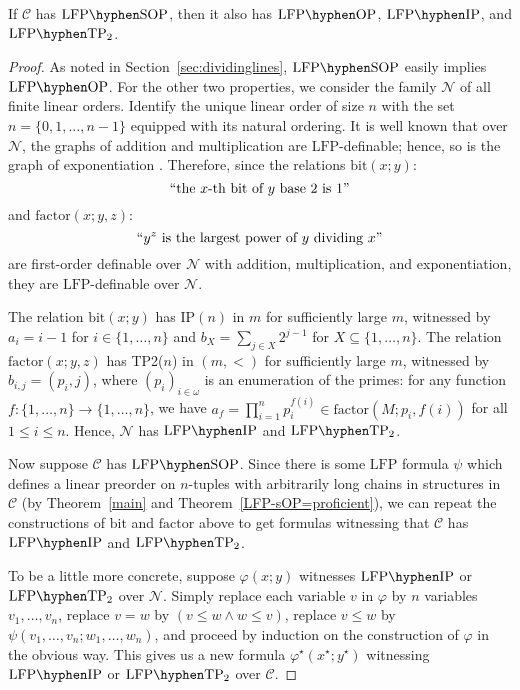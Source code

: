 \documentclass{lmcs}
\newcommand{\LFP}{\mathrm{LFP}}
\newcommand{\LFPP}[1]{\LFP\hyphen#1}
\newcommand{\OP}{\mathrm{OP}}
\newcommand{\IP}{\mathrm{IP}}
\newcommand{\SOP}{\mathrm{SOP}}
\newcommand{\TPT}{\mathrm{TP}_2}
\newcommand{\bit}{\mathrm{bit}}
\newcommand{\factor}{\mathrm{factor}}
\theoremstyle{thmC}
\begin{document}
\begin{lem}\label{fundamental-implications}
\label{N_functions}If $\mathcal{C}$ has $\LFPP{\SOP}$, then it also
has $\LFPP{\OP}$, $\LFPP{\IP}$, and $\LFPP{\TPT}$.
\end{lem}
\begin{proof}
As noted in Section~\ref{sec:dividinglines}, $\LFPP{\SOP}$ easily implies $\LFPP{\OP}$.
For the other two properties, we consider the family $\mathcal{N}$ of all finite linear orders. Identify the unique linear order of size $n$ with
the set $n=\{0,1,\dots,n-1\}$ equipped with its natural ordering. 
It is well known that over $\mathcal{N}$, the graphs of addition and multiplication are $\LFP$-definable; hence, so is the graph of exponentiation \cite{L}. Therefore, since the relations $\mathrm{bit}(x;y)$:
\[
``\text{the \ensuremath{x}-th bit of \ensuremath{y} base $2$ is $1$}"
\]
and $\mathrm{factor}(x;y,z)$:
\[
``y^{z}\text{ is the largest power of \ensuremath{y} dividing }x"
\]
are first-order definable over $\mathcal{N}$ with addition, multiplication, and exponentiation, they are $\LFP$-definable over $\mathcal{N}$.

The relation $\bit(x;y)$ has $\IP(n)$ in $m$ for sufficiently large $m$, witnessed by $a_{i}=i-1$ for $i\in \{1,\dots,n\}$ and $b_{X}=\sum_{j\in X} 2^{j-1}$ for
$X\subseteq \{1,\dots,n\}$. The relation $\factor(x;y,z)$ has TP2($n$)
in $(m,<)$ for sufficiently large $m$, witnessed by $b_{i,j}=(p_{i},j)$, where $(p_{i})_{i\in\omega}$
is an enumeration of the primes: for any function $f\colon \{1,\dots,n\}\to \{1,\dots,n\}$, we have  $a_{f}=\prod_{i=1}^{n}p_{i}^{f(i)}\in \factor(M;p_i,f(i))$ for all $1\leq i\leq n$. Hence, $\mathcal{N}$ has $\LFPP{\IP}$ and $\LFPP{\TPT}$.

Now suppose $\mathcal{C}$ has $\LFPP{\SOP}$. Since there is some $\LFP$ formula $\psi$ which defines a linear preorder on $n$-tuples with arbitrarily long chains in structures in $\mathcal{C}$ (by Theorem~\ref{main} and Theorem~\ref{LFP-sOP=proficient}), we can repeat the constructions of $\mathrm{bit}$ and $\mathrm{factor}$ above to get formulas witnessing that $\mathcal{C}$ has $\LFPP{\IP}$ and $\LFPP{\TPT}$. 

To be a little more concrete, suppose
$\varphi(x;y)$ witnesses $\LFPP{\IP}$ or $\LFPP{\TPT}$ over $\mathcal{N}$.
Simply replace each variable $v$ in $\varphi$ by $n$ variables $v_{1},\dots,v_{n}$, replace $v = w$ by $(v\leq w\land w\leq v)$, replace $v\leq w$ by $\psi(v_{1},\dots,v_{n};w_{1},\dots,w_{n})$, 
and proceed by induction on the construction of $\varphi$ in the
obvious way. This gives us a new formula $\varphi^{\star}(x^{\star};y^{\star})$
witnessing $\LFPP{\IP}$ or $\LFPP{\TPT}$ over $\mathcal{C}$.
\end{proof}
\end{document}
